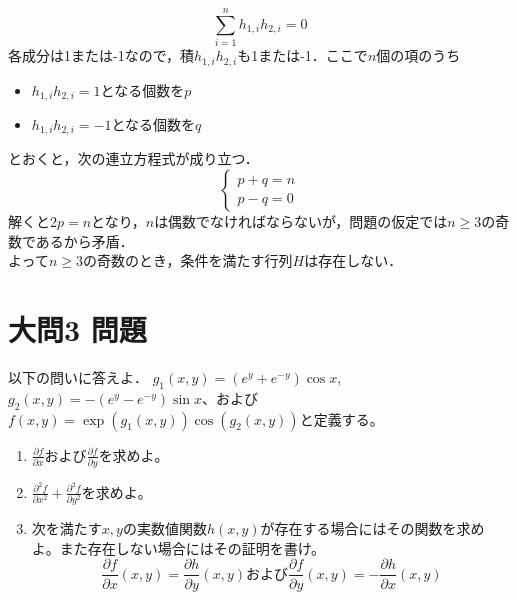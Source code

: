 \documentclass[dvipdfmx]{jsreport}
\begin{document}
\begin{souanswer}
\begin{enumerate}
\begin{equation*}
	\sum_{i= 1}^n h_{1, i}h_{2, i}= 0
\end{equation*}
	各成分は1または-1なので，積$h_{1, i}h_{2, i}$も1または-1．ここで$n$個の項のうち
\begin{itemize}
	\item $h_{1, i}h_{2, i}= 1$となる個数を$p$
	\item $h_{1, i}h_{2, i}= -1$となる個数を$q$
\end{itemize}
	とおくと，次の連立方程式が成り立つ．
\begin{equation*}
\begin{cases}
	p+ q= n\\
	p- q= 0
\end{cases}
\end{equation*}
	解くと$2p= n$となり，$n$は偶数でなければならないが，問題の仮定では$n\ge 3$の奇数であるから矛盾．\\
	よって$n\ge 3$の奇数のとき，条件を満たす行列$H$は存在しない．
\end{enumerate}
\end{souanswer}
\section{大問3 問題}
\begin{tcolorbox} %
	以下の問いに答えよ．
	$g_1(x, y)= (e^y+ e^{-y})\cos{x}$, $g_2(x, y)= -(e^y- e^{-y})\sin{x}$、および$f(x, y)= \exp{(g_1(x, y))}\cos{(g_2(x, y))}$と定義する。
\begin{enumerate}
	\item $\frac{\partial f}{\partial x}$および$\frac{\partial f}{\partial y}$を求めよ。
	\item $\frac{\partial^2 f}{\partial x^2}+ \frac{\partial^2 f}{\partial y^2}$を求めよ。
	\item 次を満たす$x, y$の実数値関数$h(x, y)$が存在する場合にはその関数を求めよ。また存在しない場合にはその証明を書け。
\begin{equation*}
	\frac{\partial f}{\partial x}(x, y)= \frac{\partial h}{\partial y}(x, y) および\frac{\partial f}{\partial y}(x, y)= -\frac{\partial h}{\partial x}(x, y)
\end{equation*}
\end{enumerate}
\end{tcolorbox}
\end{document}
